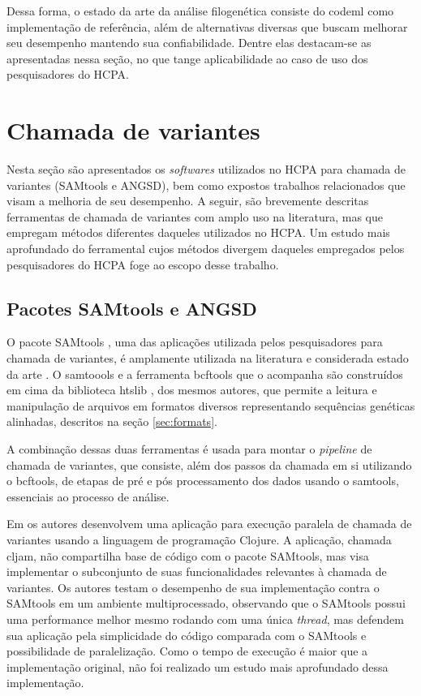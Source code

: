 \documentclass[cic,tc]{iiufrgs}
\begin{document}
Dessa forma, o estado da arte da análise filogenética consiste do codeml como
implementação de referência, além de alternativas diversas que buscam melhorar
seu desempenho mantendo sua confiabilidade. Dentre elas destacam-se as
apresentadas nessa seção, no que tange aplicabilidade ao caso de uso dos
pesquisadores do HCPA.

\section{Chamada de variantes}
\label{sec:callant}

Nesta seção são apresentados os \textit{softwares} utilizados no HCPA para
chamada de variantes (SAMtools e ANGSD), bem como expostos trabalhos
relacionados que visam a melhoria de seu desempenho. A seguir, são brevemente
descritas ferramentas de chamada de variantes com amplo uso na literatura, mas
que empregam métodos diferentes daqueles utilizados no HCPA. Um estudo mais
aprofundado do ferramental cujos métodos divergem daqueles empregados pelos
pesquisadores do HCPA foge ao escopo desse trabalho.

\subsection{Pacotes SAMtools e ANGSD}

O pacote SAMtools \cite{li2009sequence}, uma das aplicações utilizada pelos
pesquisadores para chamada de variantes, é amplamente utilizada na literatura
\cite{danecek2021twelve} e considerada estado da arte \cite{yao2020evaluation}.
O samtoools e a ferramenta bcftools que o acompanha são construídos em cima da
biblioteca htslib \cite{bonfield2021htslib}, dos mesmos autores, que permite a
leitura e manipulação de arquivos em formatos diversos representando sequências
genéticas alinhadas, descritos na seção \ref{sec:formats}.

A combinação dessas duas ferramentas é usada para montar o \textit{pipeline} de chamada
de variantes, que consiste, além dos passos da chamada em si utilizando o
bcftools, de etapas de pré e pós processamento dos dados usando o samtools,
essenciais ao processo de análise.

Em \cite{takeuchi2016cljam} os autores desenvolvem uma aplicação para execução
paralela de chamada de variantes usando a linguagem de programação Clojure. A
aplicação, chamada cljam, não compartilha base de código com o pacote SAMtools,
mas visa implementar o subconjunto de suas funcionalidades relevantes à
chamada de variantes. Os autores testam o desempenho de sua implementação
contra o SAMtools em um ambiente multiprocessado, observando que o SAMtools
possui uma performance melhor mesmo rodando com uma única \textit{thread}, mas defendem
sua aplicação pela simplicidade do código comparada com o SAMtools e
possibilidade de paralelização. Como o tempo de execução é maior que a
implementação original, não foi realizado um estudo mais aprofundado dessa
implementação.
\end{document}
